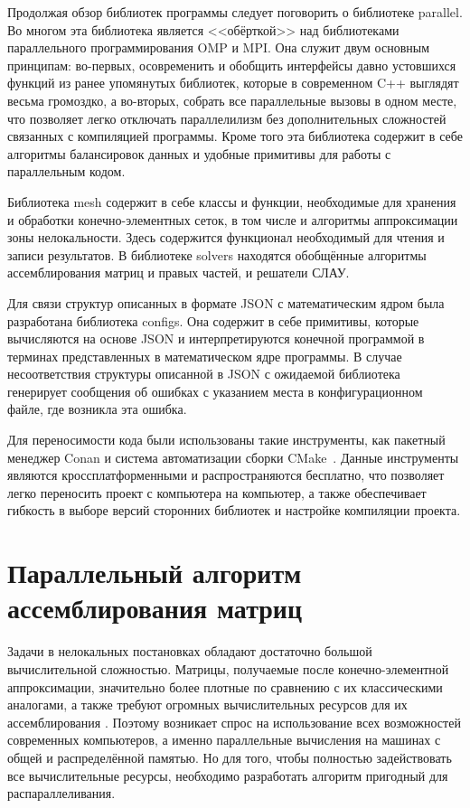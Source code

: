 Продолжая обзор библиотек программы следует поговорить о библиотеке parallel. Во многом эта библиотека является <<обёрткой>> над библиотеками параллельного программирования OMP и MPI. Она служит двум основным принципам: во-первых, осовременить и обобщить интерфейсы давно устовшихся функций из ранее упомянутых библиотек, которые в современном C++ выглядят весьма громоздко, а во-вторых, собрать все параллельные вызовы в одном месте, что позволяет легко отключать параллелилизм без дополнительных сложностей связанных с компиляцией программы. Кроме того эта библиотека содержит в себе алгоритмы балансировок данных и удобные примитивы для работы с параллельным кодом.

Библиотека mesh содержит в себе классы и функции, необходимые для хранения и обработки конечно-элементных сеток, в том числе и алгоритмы аппроксимации зоны нелокальности. Здесь содержится функционал необходимый для чтения и записи результатов. В библиотеке solvers находятся обобщённые алгоритмы ассемблирования матриц и правых частей, и решатели СЛАУ.

Для связи структур описанных в формате JSON с математическим ядром была разработана библиотека configs. Она содержит в себе примитивы, которые вычисляются на основе JSON и интерпретируются конечной программой в терминах представленных в математическом ядре программы. В случае несоответствия структуры описанной в JSON с ожидаемой библиотека генерирует сообщения об ошибках с указанием места в конфигурационном файле, где возникла эта ошибка.

Для переносимости кода были использованы такие инструменты, как пакетный менеджер Conan \cite{Conan} и система автоматизации сборки \mbox{CMake \cite{CMake}.} Данные инструменты являются кроссплатформенными и распространяются бесплатно, что позволяет легко переносить проект с компьютера на компьютер, а также обеспечивает гибкость в выборе версий сторонних библиотек и настройке компиляции \mbox{проекта.}

\section{Параллельный алгоритм ассемблирования матриц}\label{sec:ProgramComplex/ParallelAlgorithm}

Задачи в нелокальных постановках обладают достаточно большой вычислительной сложностью. Матрицы, получаемые после конечно-элементной аппроксимации, значительно более плотные по сравнению с их классическими аналогами, а также требуют огромных вычислительных ресурсов для их ассемблирования \cite{AMCSM2019}. Поэтому возникает спрос на использование всех возможностей современных компьютеров, а именно параллельные вычисления на машинах с общей и распределённой памятью. Но для того, чтобы полностью задействовать все вычислительные ресурсы, необходимо разработать алгоритм пригодный для распараллеливания.

